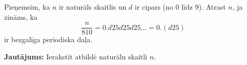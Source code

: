 \documentclass[a4paper,12pt]{article}
\newcommand\answer[1]{}
\begin{document}
\vspace{10pt}
\begin{problem}
Pieņemsim, ka $n$ ir naturāls skaitlis un $d$ ir cipars (no $0$ līdz $9$). Atrast $n$, ja zināms, ka
\[ \frac{n}{810}=0.d25d25d25... = 0.(d25) \]
ir bezgalīga periodiska daļa.

{\bf Jautājums:} Ierakstīt atbildē naturālu skaitli $n$.
\answer{

{\bf Atbilde.} $\mathtt{750}$\\
Šo uzdevumu var efektīvi risināt ar ``pilno pārlasi: Var reizināt visus skaitļus $0.(025)$, $0.(125)$, $\ldots$, $0.(925)$
ar $810$, kamēr iegūstam veselu skaitli (jāpārbauda tikai $10$ iespējas). 

Bet tā kā olimpiādēs kalkulatorus parasti nevar izmantot, 
papūlēsimies atrast analītisku risinājumu. 
Ievērojam, ka $1/999 = 0.(001)$, tāpēc katrs skaitlis ar 3-ciparu periodu ir pierakstāms kā $\overline{d25}/999$. Tā kā $999$ dalās ar $37$, 
bet $810$ nedalās ar $37$, tad ar $37$ jāvar noīsināt daļā $\overline{d25}/999$. Vienīgais skaitlis, kurš dalās ar $37$ būs $925 = 37 \cdot 25$, 
tātad cipars $d=9$.

Visbeidzot atrisinām $\frac{925}{999} = \frac{n}{810}$. Iegūstam $n = 750$.
}
\end{problem}
\end{document}
